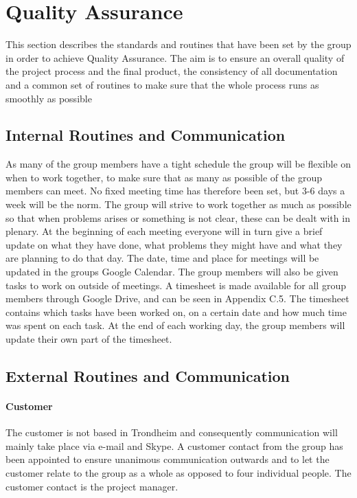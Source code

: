\section{Quality Assurance}

This section describes the standards and routines that have been set by the group in order to achieve Quality Assurance. The aim is to ensure an overall quality of the project process and the final product, the consistency of all documentation and a common set of routines to make sure that the whole process runs as smoothly as possible

\subsection{Internal Routines and Communication}

As many of the group members have a tight schedule the group will be flexible on when to work together, to make sure that as many as possible of the group members can meet. No fixed meeting time has therefore been set, but 3-6 days a week will be the norm. The group will strive to work together as much as possible so that when problems arises or something is not clear, these can be dealt with in plenary. At the beginning of each meeting everyone will in turn give a brief update on what they have done, what problems they might have and what they are planning to do that day. The date, time and place for meetings will be updated in the groups Google Calendar. The group members will also be given tasks to work on outside of meetings. A timesheet is made available for all group members through Google Drive, and can be seen in Appendix C.5. The timesheet contains which tasks have been worked on, on a certain date and how much time was spent on each task. At the end of each working day, the group members will update their own part of the timesheet.

\subsection{External Routines and Communication}

\paragraph{Customer}

The customer is not based in Trondheim and consequently communication will mainly take place via e-mail and Skype. A customer contact from the group has been appointed to ensure unanimous communication outwards and to let the customer relate to the group as a whole as opposed to four individual people. The customer contact is the project manager. 

